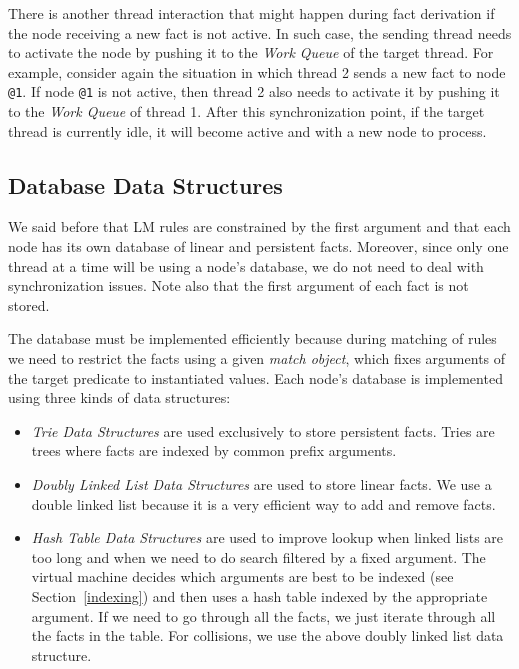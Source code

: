 \documentclass{sigplanconf}
\begin{document}
There is another thread interaction that might happen during fact
derivation if the node receiving a new fact is not active. In such
case, the sending thread needs to activate the node by pushing it to
the \emph{Work Queue} of the target thread. For example, consider
again the situation in which thread 2 sends a new fact to
node \texttt{@1}. If node \texttt{@1} is not active, then thread 2
also needs to activate it by pushing it to the \emph{Work Queue} of
thread 1. After this synchronization point, if the target thread is
currently idle, it will become active and with a new node to process.


\subsection{Database Data Structures}
\label{sec:database}

We said before that LM rules are constrained by the first argument and
that each node has its own database of linear and persistent
facts. Moreover, since only one thread at a time will be using a
node's database, we do not need to deal with synchronization
issues. Note also that the first argument of each fact is not stored.

The database must be implemented efficiently because during matching
of rules we need to restrict the facts using a given \emph{match
object}, which fixes arguments of the target predicate to instantiated
values. Each node's database is implemented using three kinds of data
structures:

\begin{itemize}
\item \emph{Trie Data Structures} are used exclusively to store 
  persistent facts. Tries are trees where facts are indexed by common
  prefix arguments.
\item \emph{Doubly Linked List Data Structures} are used to store 
  linear facts. We use a double linked list because it is a very
   efficient way to add and remove facts.
\item \emph{Hash Table Data Structures} are used to improve lookup when 
  linked lists are too long and when we need to do search filtered by
  a fixed argument. The virtual machine decides which arguments are
  best to be indexed (see Section~\ref{indexing}) and then uses a hash table
  indexed by the appropriate argument. If we need to go through all
  the facts, we just iterate through all the facts in the table. For
  collisions, we use the above doubly linked list data structure.
\end{itemize}
\end{document}
